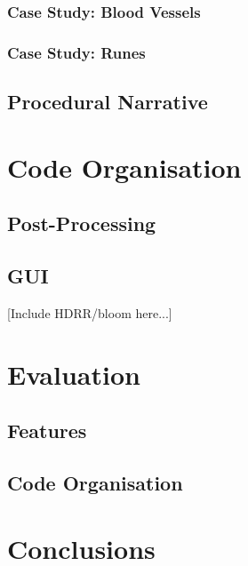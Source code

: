 \documentclass[a4paper, 11pt]{article}
\begin{document}
\begin{flushleft}
\subsubsection{Case Study: Blood Vessels} %

\subsubsection{Case Study: Runes}

\subsection{Procedural Narrative} %

\section{Code Organisation}


\subsection{Post-Processing}

\subsection{GUI}

[Include HDRR/bloom here...]

\section{Evaluation}\label{Evaluation}

\subsection{Features}

\subsection{Code Organisation}

\section{Conclusions}



\end{flushleft}
\end{document}
